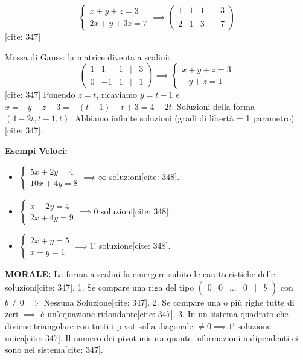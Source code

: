 \documentclass[11pt,a4paper]{article}
\begin{document}
\begin{esercizio}
$$
\begin{cases}
x + y + z = 3 \\
2x + y + 3z = 7
\end{cases}
\implies
\begin{pmatrix}
1 & 1 & 1 & | & 3 \\
2 & 1 & 3 & | & 7
\end{pmatrix}
$$
[cite: 347]

Mossa di Gauss: la matrice diventa a scalini:
$$
\begin{pmatrix}
1 & 1 & 1 & | & 3 \\
0 & -1 & 1 & | & 1
\end{pmatrix}
\implies
\begin{cases}
x + y + z = 3 \\
-y + z = 1
\end{cases}
$$
[cite: 347]
Ponendo $z = t$, ricaviamo $y = t - 1$ e $x = -y - z + 3 = -(t-1) - t + 3 = 4 - 2t$.
Soluzioni della forma $(4 - 2t, t - 1, t)$. Abbiamo infinite soluzioni (gradi di libertà = 1 parametro)[cite: 347].
\end{esercizio}

\begin{concept}
\textbf{Esempi Veloci:}
\begin{itemize}
    \item $\begin{cases} 5x + 2y = 4 \\ 10x + 4y = 8 \end{cases} \implies \infty$ soluzioni[cite: 348].
    \item $\begin{cases} x + 2y = 4 \\ 2x + 4y = 9 \end{cases} \implies 0$ soluzioni[cite: 348].
    \item $\begin{cases} 2x + y = 5 \\ x - y = 1 \end{cases} \implies 1!$ soluzione[cite: 348].
\end{itemize}

\textbf{MORALE:} La forma a scalini fa emergere subito le caratteristiche delle soluzioni[cite: 347].
1. Se compare una riga del tipo $\begin{pmatrix} 0 & 0 & \dots & 0 & | & b \end{pmatrix}$ con $b \neq 0 \implies$ Nessuna Soluzione[cite: 347].
2. Se compare una o più righe tutte di zeri $\implies$ è un'equazione ridondante[cite: 347].
3. In un sistema quadrato che diviene triangolare con tutti i pivot sulla diagonale $\neq 0 \implies 1!$ soluzione unica[cite: 347].
Il numero dei pivot misura quante informazioni indipendenti ci sono nel sistema[cite: 347].
\end{concept}
\end{document}
